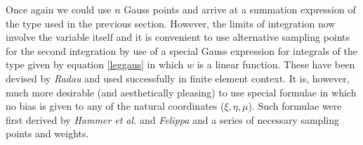 Once again we could use $ n $ Gauss points and arrive at a summation expression of
the type used in the previous section. However, the limits of integration now
involve the variable itself and it is convenient to use alternative sampling points
for the second integration by use of a special Gauss expression for integrals of
the type given by equation \eqref{leggaus} in which $ w $ is a linear function.
These have been devised by \textit{Radau} and used successfully in finite element context.
It is, however, much more desirable (and aesthetically pleasing) to use special
formulae in which no bias is given to any of the natural coordinates ($\xi, \eta, \mu$).
Such formulae were first derived by \textit{Hammer et al.} and \textit{Felippa}
and a series of necessary sampling points and weights.

\newpage
\begin{table}[h!]
    \centering
    \renewcommand{\arraystretch}{1.25}
\end{table}
